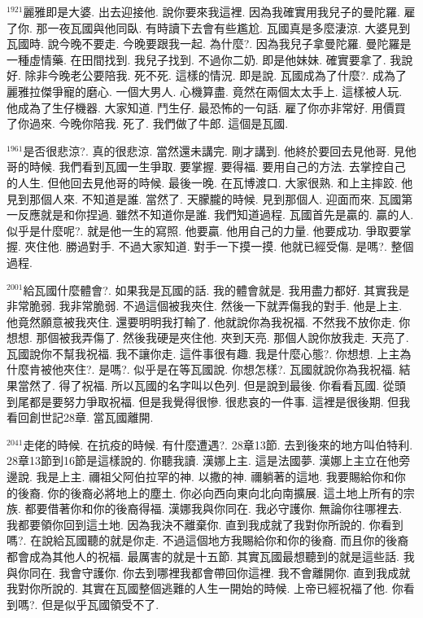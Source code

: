 \documentclass{book}
\begin{document}
$^{1921}$麗雅即是大婆.
出去迎接他.
說你要來我這裡.
因為我確實用我兒子的曼陀羅.
雇了你.
那一夜瓦國與他同臥.
有時讀下去會有些尷尬.
瓦國真是多麼淒涼.
大婆見到瓦國時.
說今晚不要走.
今晚要跟我一起.
為什麼?.
因為我兒子拿曼陀羅.
曼陀羅是一種虛情藥.
在田間找到.
我兒子找到.
不過你二奶.
即是他妹妹.
確實要拿了.
我說好.
除非今晚老公要陪我.
死不死.
這樣的情況.
即是說.
瓦國成為了什麼?.
成為了麗雅拉傑爭寵的磨心.
一個大男人.
心機算盡.
竟然在兩個太太手上.
這樣被人玩.
他成為了生仔機器.
大家知道.
鬥生仔.
最恐怖的一句話.
雇了你亦非常好.
用價買了你過來.
今晚你陪我.
死了.
我們做了牛郎.
這個是瓦國.

$^{1961}$是否很悲涼?.
真的很悲涼.
當然還未講完.
剛才講到.
他終於要回去見他哥.
見他哥的時候.
我們看到瓦國一生爭取.
要掌握.
要得福.
要用自己的方法.
去掌控自己的人生.
但他回去見他哥的時候.
最後一晚.
在瓦博渡口.
大家很熟.
和上主摔跤.
他見到那個人來.
不知道是誰.
當然了.
天朦朧的時候.
見到那個人.
迎面而來.
瓦國第一反應就是和你捏過.
雖然不知道你是誰.
我們知道過程.
瓦國首先是贏的.
贏的人.
似乎是什麼呢?.
就是他一生的寫照.
他要贏.
他用自己的力量.
他要成功.
爭取要掌握.
夾住他.
勝過對手.
不過大家知道.
對手一下摸一摸.
他就已經受傷.
是嗎?.
整個過程.

$^{2001}$給瓦國什麼體會?.
如果我是瓦國的話.
我的體會就是.
我用盡力都好.
其實我是非常脆弱.
我非常脆弱.
不過這個被我夾住.
然後一下就弄傷我的對手.
他是上主.
他竟然願意被我夾住.
還要明明我打輸了.
他就說你為我祝福.
不然我不放你走.
你想想.
那個被我弄傷了.
然後我硬是夾住他.
夾到天亮.
那個人說你放我走.
天亮了.
瓦國說你不幫我祝福.
我不讓你走.
這件事很有趣.
我是什麼心態?.
你想想.
上主為什麼肯被他夾住?.
是嗎?.
似乎是在等瓦國說.
你想怎樣?.
瓦國就說你為我祝福.
結果當然了.
得了祝福.
所以瓦國的名字叫以色列.
但是說到最後.
你看看瓦國.
從頭到尾都是要努力爭取祝福.
但是我覺得很慘.
很悲哀的一件事.
這裡是很後期.
但我看回創世記28章.
當瓦國離開.

$^{2041}$走佬的時候.
在抗疫的時候.
有什麼遭遇?.
28章13節.
去到後來的地方叫伯特利.
28章13節到16節是這樣說的.
你聽我讀.
漢娜上主.
這是法國夢.
漢娜上主立在他旁邊說.
我是上主.
禰祖父阿伯拉罕的神.
以撒的神.
禰躺著的這地.
我要賜給你和你的後裔.
你的後裔必將地上的塵土.
你必向西向東向北向南擴展.
這土地上所有的宗族.
都要借著你和你的後裔得福.
漢娜我與你同在.
我必守護你.
無論你往哪裡去.
我都要領你回到這土地.
因為我決不離棄你.
直到我成就了我對你所說的.
你看到嗎?.
在說給瓦國聽的就是你走.
不過這個地方我賜給你和你的後裔.
而且你的後裔都會成為其他人的祝福.
最厲害的就是十五節.
其實瓦國最想聽到的就是這些話.
我與你同在.
我會守護你.
你去到哪裡我都會帶回你這裡.
我不會離開你.
直到我成就我對你所說的.
其實在瓦國整個逃難的人生一開始的時候.
上帝已經祝福了他.
你看到嗎?.
但是似乎瓦國領受不了.
\end{document}
